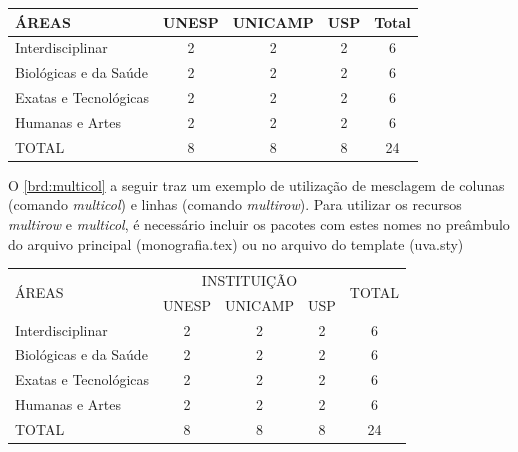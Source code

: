     \begin{board}[!htb]
        \centering
        \caption{Modelo de Quadro}
        \label{brd:modelo}
        \begin{tabular}{|l|c|c|c|c|}                                 \hline
            ÁREAS                 & UNESP & UNICAMP & USP & Total \\ \hline \hline
            Interdisciplinar      &  2    &  2      & 2   &  6    \\ \hline
            Biológicas e da Saúde &  2    &  2      & 2   &  6    \\ \hline
            Exatas e Tecnológicas &  2    &  2      & 2   &  6    \\ \hline
            Humanas e Artes       &  2    &  2      & 2   &  6    \\ \hline
            TOTAL                 &  8    &  8      & 8   & 24    \\ \hline
        \end{tabular}
        \vspace{0.2cm}
    \end{board}

    O \cref{brd:multicol} a seguir traz um exemplo de utilização de mesclagem de colunas (comando \emph{multicol}) e linhas (comando \emph{multirow}). Para utilizar os recursos \emph{multirow} e \emph{multicol}, é necessário incluir os pacotes com estes nomes no preâmbulo do arquivo principal (monografia.tex) ou no arquivo do template (uva.sty)

    \begin{board}[!htb]
        \small
        \centering
        \caption{Modelo de quadro com mesclagem de colunas e linhas}
        \label{brd:multicol}
        \begin{tabular}{|l|c|c|c|c|}                                                              \hline
            \multirow{2}{*}{ÁREAS} & \multicolumn{3}{c|}{INSTITUIÇÃO} & \multirow{2}{*}{TOTAL} \\ \hhline{|~|-|-|-|~|}
            ~                      & UNESP     & UNICAMP  & USP      & ~                       \\ \hline
            Interdisciplinar       &  2        &  2       & 2        &  6                      \\
            Biológicas e da Saúde  &  2        &  2       & 2        &  6                      \\
            Exatas e Tecnológicas  &  2        &  2       & 2        &  6                      \\
            Humanas e Artes        &  2        &  2       & 2        &  6                      \\ \hline
            TOTAL                  &  8        &  8       & 8        & 24                      \\ \hline
        \end{tabular}
        \vspace{0.2cm}
    \end{board}

